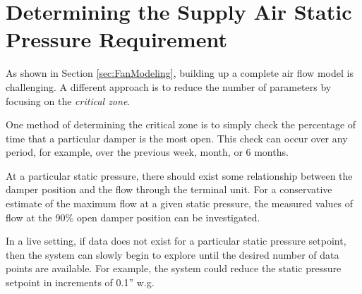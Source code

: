 \section{Determining the Supply Air Static Pressure Requirement}

As shown in Section \ref{sec:FanModeling}, building up a complete air flow model is challenging. A different approach is to reduce the number of parameters by focusing on the \textit{critical zone}. 

One method of determining the critical zone is to simply check the percentage of time that a particular damper is the most open. This check can occur over any period, for example, over the previous week, month, or 6 months.

At a particular static pressure, there should exist some relationship between the damper position and the flow through the terminal unit. For a conservative estimate of the maximum flow at a given static pressure, the measured values of flow at the 90\% open damper position can be investigated. 

In a live setting, if data does not exist for a particular static pressure setpoint, then the system can slowly begin to explore until the desired number of data points are available. For example, the system could reduce the static pressure setpoint in increments of 0.1'' w.g. 




%
%
%
%
%
%
%
%



























